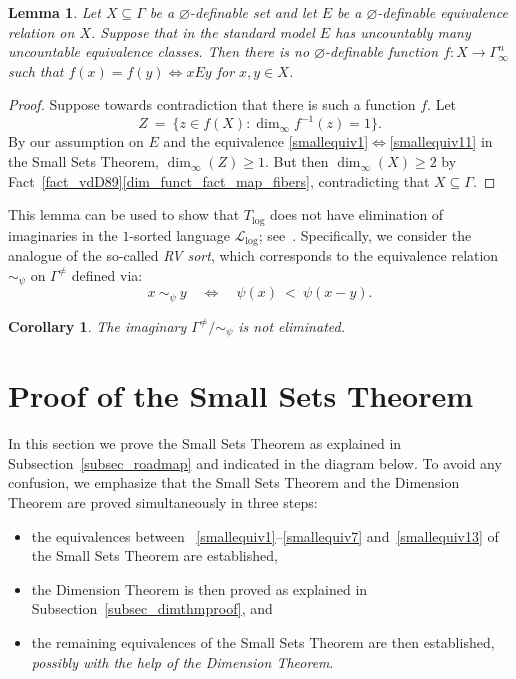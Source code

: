 \documentclass[11pt]{amsart}
\theoremstyle{plain}
\newtheorem{lemma}[thm]{Lemma}
\newtheorem{cor}[thm]{Corollary}
\theoremstyle{definition}
\numberwithin{equation}{section}
\newcommand\0{\varnothing}
\begin{document}
\begin{lemma}
Let $X \subseteq \Gamma$ be a $\varnothing$-definable set and let $E$ be a $\varnothing$-definable equivalence relation on $X$. Suppose that in the standard model $E$ has uncountably many uncountable equivalence classes. Then there is no $\varnothing$-definable function $f\colon X\to\Gamma_{\infty}^{n}$ such that $f(x) = f(y) \Leftrightarrow xEy$ for $x,y \in X$.
\end{lemma}
\begin{proof}
Suppose towards contradiction that there is such a function $f$. Let 
\[
Z\ =\ \{z \in f(X): \dim_\infty f^{-1}(z) = 1\}.
\]
By our assumption on $E$ and the equivalence \eqref{smallequiv1}$\Leftrightarrow$\eqref{smallequiv11} in the Small Sets Theorem, $\dim_\infty(Z)\geq 1$. But then $\dim_{\infty}(X)\geq 2$ by Fact~\ref{fact_vdD89}\eqref{dim_funct_fact_map_fibers}, contradicting that $X \subseteq \Gamma$. 
\end{proof}

\noindent
This lemma can be used to show that $T_{\log}$ does not have elimination of imaginaries in the $1$-sorted language $\mathcal{L}_{\log}$; see~\cite[Lemma 8.4.7]{tent2012course}. Specifically, we consider the analogue of the so-called \emph{RV sort}, which corresponds to the equivalence relation $\sim_{\psi}$ on $\Gamma^{\neq}$ defined via:
\[
x \ \sim_{\psi} \ y\quad \iff \quad \psi(x) \ < \ \psi(x-y).
\]
\begin{cor}\label{RV_sort_not_EI}
The imaginary $\Gamma^{\neq}/\!\sim_{\psi}$ is not eliminated. \end{cor}









\section{Proof of the Small Sets Theorem}\label{sec_sstproof}


\noindent
In this section we prove the Small Sets Theorem as explained in Subsection~\ref{subsec_roadmap} and indicated in the diagram below. To avoid any confusion, we emphasize that the Small Sets Theorem and the Dimension Theorem are proved simultaneously in three steps:
\begin{itemize}
\item[(1st)] the equivalences between ~\eqref{smallequiv1}--\eqref{smallequiv7} and~\eqref{smallequiv13} of the Small Sets Theorem are established,
\item[(2nd)] the Dimension Theorem is then proved as explained in Subsection~\ref{subsec_dimthmproof}, and
\item[(3rd)] the remaining equivalences of the Small Sets Theorem are then established, \emph{possibly with the help of the Dimension Theorem}.
\end{itemize}
\end{document}
